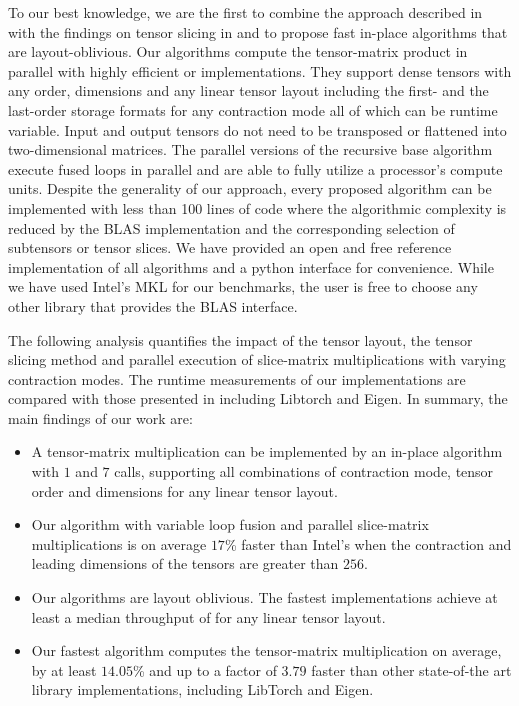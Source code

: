 To our best knowledge, we are the first to combine the approach described in \cite{bassoy:2019:ttv} with the findings on tensor slicing in \cite{li:2015:input} and to propose fast in-place algorithms that are layout-oblivious.
Our algorithms compute the tensor-matrix product in parallel with highly efficient  or  implementations.
They support dense tensors with any order, dimensions and any linear tensor layout including the first- and the last-order storage formats for any contraction mode all of which can be runtime variable.
Input and output tensors do not need to be transposed or flattened into two-dimensional matrices.
The parallel versions of the recursive base algorithm execute fused loops in parallel and are able to fully utilize a processor's compute units.
Despite the generality of our approach, every proposed algorithm can be implemented with less than 100 lines of  code where the algorithmic complexity is reduced by the BLAS implementation and the corresponding selection of subtensors or tensor slices.
We have provided an open and free reference  implementation of all algorithms and a python interface for convenience.
While we have used Intel's MKL for our benchmarks, the user is free to choose any other library that provides the BLAS interface.

The following analysis quantifies the impact of the tensor layout, the tensor slicing method and parallel execution of slice-matrix multiplications with varying contraction modes.
The runtime measurements of our implementations are compared with those presented in \cite{springer:2018:design, matthews:2018:high} including Libtorch and Eigen.
In summary, the main findings of our work are:
\begin{itemize}
	\item 
	A tensor-matrix multiplication can be implemented by an in-place algorithm with $1$  and $7$  calls, supporting all combinations of contraction mode, tensor order and dimensions for any linear tensor layout.
	\item 
	Our algorithm with variable loop fusion and parallel slice-matrix multiplications is on average $17$\% faster than Intel's  when the contraction and leading dimensions of the tensors are greater than $256$.
	\item 
	Our algorithms are layout oblivious.
	The fastest implementations achieve at least a median throughput of \tq for any linear tensor layout.
	\item
	Our fastest algorithm computes the tensor-matrix multiplication on average, by at least $14.05$\% and up to a factor of $3.79$ faster than other state-of-the art library implementations, including LibTorch and Eigen.
\end{itemize}

